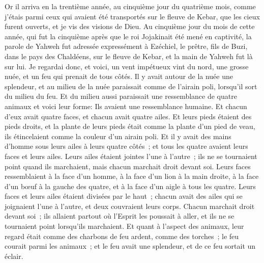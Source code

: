 \begin{multicols}{2}
\VerseOne{}Or il arriva en la trentième année, au cinquième jour du quatrième mois, comme j'étais parmi ceux qui avaient été transportés sur le fleuve de Kebar, que les cieux furent ouverts, et je vis des visions de Dieu.
Au cinquième jour du mois de cette année, qui fut la cinquième après que le roi Jojakinait été mené en captivité,
la parole de Yahweh fut adressée expressément à Ezéchiel, le prêtre, fils de Buzi, dans le pays des Chaldéens, sur le fleuve de Kebar, et la main de Yahweh fut là sur lui.
Je regardai donc, et voici, un vent impétueux vint du nord, une grosse nuée, et un feu qui prenait de tous côtés. Il y avait autour de la nuée une splendeur, et au milieu de la nuée paraissait comme de l'airain poli, lorsqu'il sort du milieu du feu.
Et du milieu aussi paraissait une ressemblance de quatre animaux et voici leur forme: Ils avaient une ressemblance humaine.
Et chacun d'eux avait quatre faces, et chacun avait quatre ailes.
Et leurs pieds étaient des pieds droits, et la plante de leurs pieds était comme la plante d'un pied de veau, ils étincelaient comme la couleur d'un airain poli.
Et il y avait des mains d'homme sous leurs ailes à leurs quatre côtés~; et tous les quatre avaient leurs faces et leurs ailes.
Leurs ailes étaient jointes l'une à l'autre~; ils ne se tournaient point quand ils marchaient, mais chacun marchait droit devant soi.
Leurs faces ressemblaient à la face d'un homme, à la face d'un lion à la main droite, à la face d'un bœuf à la gauche des quatre, et à la face d'un aigle à tous les quatre.
Leurs faces et leurs ailes étaient divisées par le haut~; chacun avait des ailes qui se joignaient l'une à l'autre, et deux couvraient leurs corps.
Chacun marchait droit devant soi~; ils allaient partout où l'Esprit les poussait à aller, et ils ne se tournaient point lorsqu'ils marchaient.
Et quant à l'aspect des animaux, leur regard était comme des charbons de feu ardent, comme des torches~; le feu courait parmi les animaux~; et le feu avait une splendeur, et de ce feu sortait un éclair.

\end{multicols}
